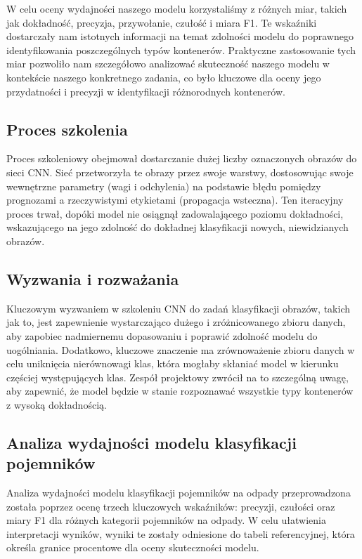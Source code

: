 \documentclass[12pt, a4paper, twoside, openany]{book}
\newcommand{\forceindent}{\leavevmode{\parindent=1.3em\indent}}
\begin{document}
{W celu oceny wydajności naszego modelu korzystaliśmy z różnych miar, takich jak dokładność, precyzja, przywołanie, czułość i miara F1. Te wskaźniki dostarczały nam istotnych informacji na temat zdolności modelu do poprawnego identyfikowania poszczególnych typów kontenerów. Praktyczne zastosowanie tych miar pozwoliło nam szczegółowo analizować skuteczność naszego modelu w kontekście naszego konkretnego zadania, co było kluczowe dla oceny jego przydatności i precyzji w identyfikacji różnorodnych kontenerów.

\subsection{Proces szkolenia}
\forceindent Proces szkoleniowy obejmował dostarczanie dużej liczby oznaczonych obrazów do sieci CNN. Sieć przetworzyła te obrazy przez swoje warstwy, dostosowując swoje wewnętrzne parametry (wagi i odchylenia) na podstawie błędu pomiędzy prognozami a rzeczywistymi etykietami (propagacja wsteczna).
Ten iteracyjny proces trwał, dopóki model nie osiągnął zadowalającego poziomu dokładności, wskazującego na jego zdolność do dokładnej klasyfikacji nowych, niewidzianych obrazów.

\subsection{Wyzwania i rozważania}
\forceindent Kluczowym wyzwaniem w szkoleniu CNN do zadań klasyfikacji obrazów, takich jak to, jest zapewnienie wystarczająco dużego i zróżnicowanego zbioru danych, aby zapobiec nadmiernemu dopasowaniu i poprawić zdolność modelu do uogólniania.
Dodatkowo, kluczowe znaczenie ma zrównoważenie zbioru danych w celu uniknięcia nierównowagi klas, która mogłaby skłaniać model w kierunku częściej występujących klas. Zespół projektowy zwrócił na to szczególną uwagę, aby zapewnić, że model będzie w stanie rozpoznawać wszystkie typy kontenerów z wysoką dokładnością.

\subsection{Analiza wydajności modelu klasyfikacji pojemników}

Analiza wydajności modelu klasyfikacji pojemników na odpady przeprowadzona została poprzez ocenę trzech kluczowych wskaźników: precyzji, czułości oraz miary F1 dla różnych kategorii pojemników na odpady. W celu ułatwienia interpretacji wyników, wyniki te zostały odniesione do tabeli referencyjnej, która określa granice procentowe dla oceny skuteczności modelu.

}
\end{document}
